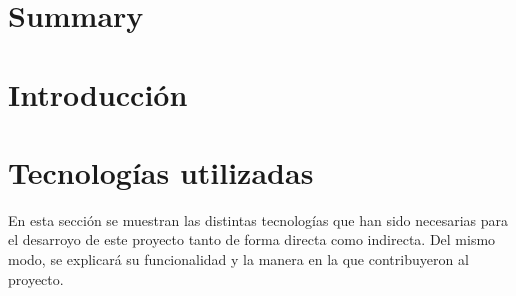 \documentclass[a4paper, 12pt]{book}
\begin{document}

\chapter*{Summary}



\tableofcontents
\cleardoublepage
\listoffigures %



\cleardoublepage
\chapter{Introducción}
\label{sec:intro} %





\cleardoublepage %
\chapter{Tecnologías utilizadas} 
\label{chap:tecnologias} %
En esta sección se muestran las distintas tecnologías que han sido necesarias para el desarroyo de este proyecto tanto de forma directa como indirecta. Del mismo modo, se explicará su funcionalidad
y la manera en la que contribuyeron al proyecto. 
\end{document}
